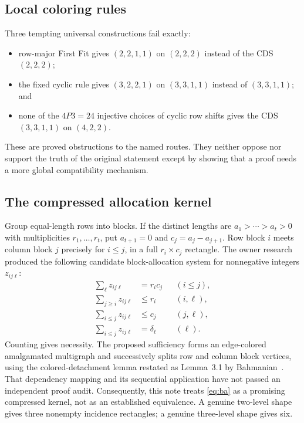 \documentclass[11pt]{amsart}
\theoremstyle{definition}
\begin{document}
\subsection{Local coloring rules}

Three tempting universal constructions fail exactly:
\begin{itemize}
 \item row-major First Fit gives $(2,2,1,1)$ on $(2,2,2)$ instead of the
 CDS $(2,2,2)$;
 \item the fixed cyclic rule gives $(3,2,2,1)$ on $(3,3,1,1)$ instead of
 $(3,3,1,1)$; and
 \item none of the $4P3=24$ injective choices of cyclic row shifts gives
 the CDS $(3,3,1,1)$ on $(4,2,2)$.
\end{itemize}
These are proved obstructions to the named routes.  They neither oppose nor
support the truth of the original statement except by showing that a proof
needs a more global compatibility mechanism.

\subsection{The compressed allocation kernel}

Group equal-length rows into blocks.  If the distinct lengths are
$a_1>\cdots>a_t>0$ with multiplicities $r_1,\ldots,r_t$, put
$a_{t+1}=0$ and $c_j=a_j-a_{j+1}$.  Row block $i$ meets column block $j$
precisely for $i\leq j$, in a full $r_i\times c_j$ rectangle.  The owner
research produced the following candidate block-allocation system for
nonnegative integers $z_{ij\ell}$:
\begin{align}
 \sum_\ell z_{ij\ell}&=r_ic_j &&(i\leq j),\nonumber\\
 \sum_{j\geq i}z_{ij\ell}&\leq r_i &&(i,\ell),\nonumber\\
 \sum_{i\leq j}z_{ij\ell}&\leq c_j &&(j,\ell),\nonumber\\
 \sum_{i\leq j}z_{ij\ell}&=\delta_\ell &&(\ell).
 \label{eq:ba}
\end{align}
Counting gives necessity.  The proposed sufficiency forms an edge-colored
amalgamated multigraph and successively splits row and column block vertices,
using the colored-detachment lemma restated as Lemma~3.1 by
Bahmanian~\cite{Bahmanian2026}.  That dependency mapping and its
sequential application have not passed an independent proof audit.
Consequently, this note treats \eqref{eq:ba} as a promising compressed
kernel, not as an established equivalence.  A genuine two-level shape gives
three nonempty incidence rectangles; a genuine three-level shape gives six.
\end{document}
